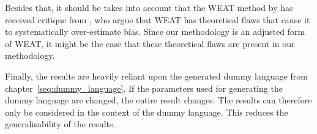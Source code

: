 Besides that, it should be takes into account that the WEAT method by 
\textcite{caliskan_2017_semantics_language_corpora}
has received critique from \textcite{ethayarajh-etal-2019-understanding}, who argue that
WEAT has theoretical flaws that cause it to systematically over-estimate bias. Since
our methodology is an adjusted form of WEAT, it might be the case that these
theoretical flaws are present in our methodology.

Finally, the results are heavily reliant upon the generated dummy language from
chapter~\ref{seq:dummy_language}. If the parameters used for generating the dummy language
are changed, the entire result changes. The results can therefore only be considered
in the context of the dummy language. This reduces the generalisability of the results.


%
%
%
